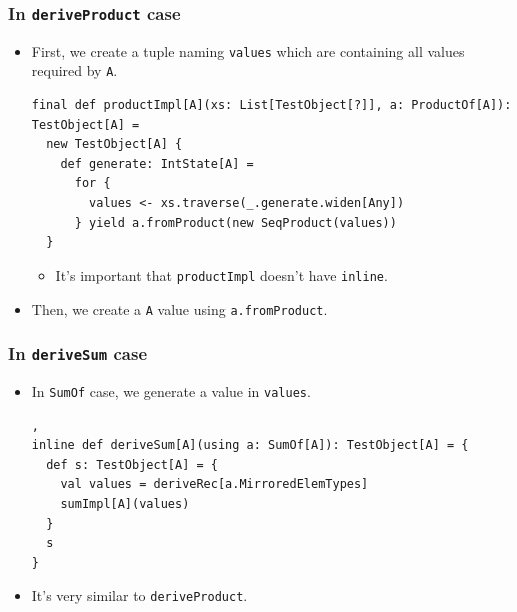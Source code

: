 \begin{frame}[fragile]
  \frametitle{ In \lstinline|deriveProduct| case}

  \begin{itemize}
    \item<+-> First, we create a tuple naming \lstinline|values| which are containing all values 
    required by \lstinline|A|.
\begin{lstlisting}[style=scala]
final def productImpl[A](xs: List[TestObject[?]], a: ProductOf[A]): TestObject[A] =
  new TestObject[A] {
    def generate: IntState[A] =
      for {
        values <- xs.traverse(_.generate.widen[Any])
      } yield a.fromProduct(new SeqProduct(values))
  }
\end{lstlisting}
    \begin{itemize}
      \item It's important that \lstinline|productImpl| doesn't have \lstinline|inline|.
    \end{itemize}

    \item<+-> Then, we create a \lstinline|A| value using \lstinline|a.fromProduct|.
  \end{itemize}

\end{frame}

\begin{frame}[fragile]
  \frametitle{ In \lstinline|deriveSum| case}

  \begin{itemize}
    \item In \lstinline|SumOf| case, we generate a value in \lstinline|values|.
\begin{lstlisting}[style=scala],
inline def deriveSum[A](using a: SumOf[A]): TestObject[A] = {
  def s: TestObject[A] = {
    val values = deriveRec[a.MirroredElemTypes]
    sumImpl[A](values)
  }
  s
}
\end{lstlisting}
    \item It's very similar to \lstinline|deriveProduct|.
  \end{itemize}

\end{frame}

